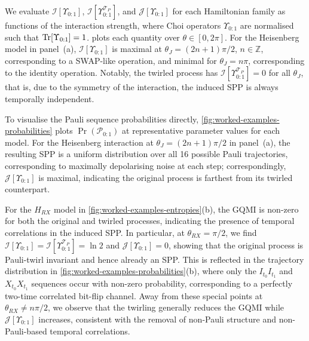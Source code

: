 We evaluate \(\mathcal{I}[\Upsilon_{0:1}]\), \(\mathcal{I}[\Upsilon_{0:1}^{\mathcal{T}_P}]\), and \(\mathcal{J}[\Upsilon_{0:1}]\) for each Hamiltonian family as functions of the interaction strength, where Choi operators \(\Upsilon_{0:1}\) are normalised such that \(\mathrm{Tr}[\Upsilon_{0:1}] = 1\).  plots each quantity over \(\theta \in [0,2\pi]\). For the Heisenberg model in panel~(a), \(\mathcal{I}[\Upsilon_{0:1}]\) is maximal at \(\theta_J = (2n+1)\pi/2\), \(n \in \mathbb{Z}\), corresponding to a SWAP-like operation, and minimal for \(\theta_J = n\pi\), corresponding to the identity operation. Notably, the twirled process has \(\mathcal{I}[\Upsilon_{0:1}^{\mathcal{T}_P}] = 0\) for all \(\theta_J\), that is, due to the symmetry of the interaction, the induced SPP is always temporally independent.

To visualise the Pauli sequence probabilities directly, \cref{fig:worked-examples-probabilities} plots \(\Pr(\mathcal{P}_{0:1})\) at representative parameter values for each model. For the Heisenberg interaction at \(\theta_J = (2n + 1)\pi/2\) in panel~(a), the resulting SPP is a uniform distribution over all 16 possible Pauli trajectories, corresponding to maximally depolarising noise at each step; correspondingly, \(\mathcal{J}[\Upsilon_{0:1}]\) is maximal, indicating the original process is farthest from its twirled counterpart.

For the \(H_{RX}\) model in \cref{fig:worked-examples-entropies}(b), the GQMI is non-zero for both the original and twirled processes, indicating the presence of temporal correlations in the induced SPP. In particular, at \(\theta_{RX} = \pi/2\), we find \(\mathcal{I}[\Upsilon_{0:1}] = \mathcal{I}[\Upsilon_{0:1}^{\mathcal{T}_P}] = \ln 2\) and \(\mathcal{J}[\Upsilon_{0:1}] = 0\), showing that the original process is Pauli-twirl invariant and hence already an SPP. This is reflected in the trajectory distribution in \cref{fig:worked-examples-probabilities}(b), where only the \(I_{t_0}I_{t_1}\) and \(X_{t_0}X_{t_1}\) sequences occur with non-zero probability, corresponding to a perfectly two-time correlated bit-flip channel. Away from these special points at \(\theta_{RX} \neq n\pi/2\), we observe that the twirling generally reduces the GQMI while \(\mathcal{J}[\Upsilon_{0:1}]\) increases, consistent with the removal of non-Pauli structure and non-Pauli-based temporal correlations.

